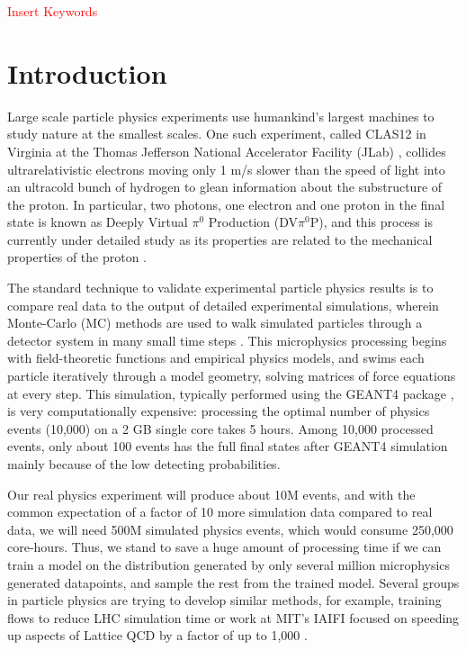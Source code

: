\documentclass[conference]{IEEEtran}
\begin{document}
\begin{IEEEkeywords}
\textcolor{red}{Insert Keywords}
\end{IEEEkeywords}

\section{Introduction}
Large scale particle physics experiments use humankind's largest machines to study nature at the smallest scales. One such experiment, called CLAS12 in Virginia at the Thomas Jefferson National Accelerator Facility (JLab) \cite{BURKERT2020163419}, collides ultrarelativistic electrons moving only 1 m/s slower than the speed of light into an ultracold bunch of hydrogen to glean information about the substructure of the proton. In particular, two photons, one electron and one proton in the final state is known as Deeply Virtual $\pi^0$ Production (DV$\pi^0$P), and this process is currently under detailed study as its properties are related to the mechanical properties of the proton \cite{PhysRevD.55.7114}.

The standard technique to validate experimental particle physics results is to compare real data to the output of detailed experimental simulations, wherein Monte-Carlo (MC) methods are used to walk simulated particles through a detector system in many small time steps \cite{PhysRevLett.115.212003, 10.1093/ptep/ptaa104}. This microphysics processing begins with field-theoretic functions and empirical physics models, and swims each particle iteratively through a model geometry, solving matrices of force equations at every step. This simulation, typically performed using the GEANT4 package \cite{AGOSTINELLI2003250}, is very computationally expensive: processing the optimal number of physics events (10,000) on a 2 GB single core takes 5 hours. Among 10,000 processed events, only about 100 events has the full final states after GEANT4 simulation mainly because of the low detecting probabilities.

Our real physics experiment will produce about 10M events, and with the common expectation of a factor of 10 more simulation data compared to real data, we will need 500M simulated physics events, which would consume 250,000 core-hours. Thus, we stand to save a huge amount of processing time if we can train a model on the distribution generated by only several million microphysics generated datapoints, and sample the rest from the trained model. Several groups in particle physics are trying to develop similar methods, for example, training flows to reduce LHC simulation time \cite{stan} or work at MIT's IAIFI focused on speeding up aspects of Lattice QCD by a factor of up to 1,000 \cite{phialia}.
\end{document}
